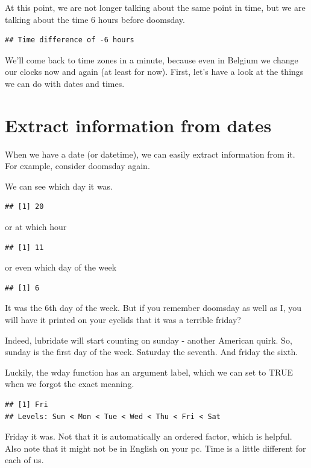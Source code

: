 \documentclass[]{tufte-book}
\begin{document}
At this point, we are not longer talking about the same point in time, but we are talking about the time 6 hours before doomsday.

\begin{verbatim}
## Time difference of -6 hours
\end{verbatim}

We'll come back to time zones in a minute, because even in Belgium we change our clocks now and again (at least for now). First, let's have a look at the things we can do with dates and times.

\hypertarget{extract-information-from-dates}{%
\section{Extract information from dates}\label{extract-information-from-dates}}

When we have a date (or datetime), we can easily extract information from it. For example, consider doomsday again.

We can see which day it was.

\begin{verbatim}
## [1] 20
\end{verbatim}

or at which hour

\begin{verbatim}
## [1] 11
\end{verbatim}

or even which day of the week

\begin{verbatim}
## [1] 6
\end{verbatim}

It was the 6th day of the week. But if you remember doomsday as well as I, you will have it printed on your eyelids that it was a terrible friday?

Indeed, lubridate will start counting on sunday - another American quirk. So, sunday is the first day of the week. Saturday the seventh. And friday the sixth.

Luckily, the wday function has an argument label, which we can set to TRUE when we forgot the exact meaning.

\begin{verbatim}
## [1] Fri
## Levels: Sun < Mon < Tue < Wed < Thu < Fri < Sat
\end{verbatim}

Friday it was. Not that it is automatically an ordered factor, which is helpful. Also note that it might not be in English on your pc. Time is a little different for each of us.
\end{document}
